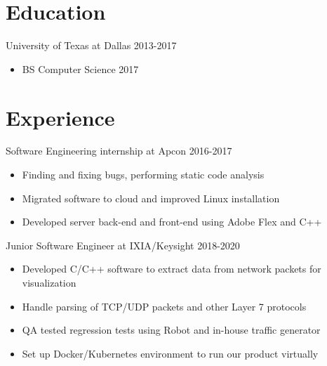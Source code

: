\documentclass[line,margin]{res}
\begin{document}
	\address{(512)574-6609 ||
	\href{mailto:blakerandall0@gmail.com}{blakerandall0@gmail.com}}

\begin{resume}

\vspace{8pt}

\vspace{-4pt}
\section{Education}
\vspace{12pt}
University of Texas at Dallas \hfill 2013-2017 \\
\vspace{-12pt}
	\begin{itemize} \itemsep -2pt
	\item BS Computer Science 2017
	\end{itemize}

\vspace{-4pt}
\section{Experience}
\vspace{12pt}
Software Engineering internship at Apcon
\hfill 2016-2017
	\begin{itemize} \itemsep -2pt
	\item Finding and fixing bugs, performing static code analysis
	\item Migrated software to cloud and improved Linux installation
	\item Developed server back-end and front-end using Adobe Flex and C++
	\end{itemize}

Junior Software Engineer at IXIA/Keysight
\hfill 2018-2020
	\begin{itemize} \itemsep -2pt
	\item Developed C/C++ software to extract data from network packets for visualization
	\item Handle parsing of TCP/UDP packets and other Layer 7 protocols
	\item QA tested regression tests using Robot and in-house traffic generator
	\item Set up Docker/Kubernetes environment to run our product virtually
	\end{itemize}


\end{resume}
\end{document}
